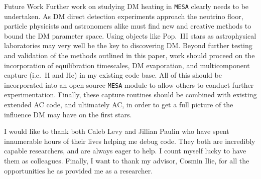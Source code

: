 \documentclass[a4paper,11pt]{article}
\begin{document}
\begin{section}{Future Work}
    Further work on studying DM heating in \texttt{MESA} clearly needs to be undertaken.
    As DM direct detection experiments approach the neutrino floor, particle physicists and astronomers alike must find new and creative methods to bound the DM parameter space.
    Using objects like Pop.~III stars as astrophysical laboratories may very well be the key to discovering DM.
    Beyond further testing and validation of the methods outlined in this paper, work should proceed on the incorporation of equilibration timescales, DM evaporation, and multicomponent capture (i.e.~H and He) in my existing code base.
    All of this should be incorporated into an open source \texttt{MESA} module to allow others to conduct further experimentation.
    Finally, these capture routines should be combined with existing extended AC code, and ultimately AC, in order to get a full picture of the influence DM may have on the first stars.
\end{section}



\begin{acknowledgments}
    I would like to thank both Caleb Levy and Jillian Paulin who have spent innumerable hours of their lives helping me debug code.
    They both are incredibly capable researchers, and are always eager to help.
    I count myself lucky to have them as colleagues.
    Finally, I want to thank my advisor, Cosmin Ilie, for all the opportunities he as provided me as a researcher.
\end{acknowledgments}



\end{document}
